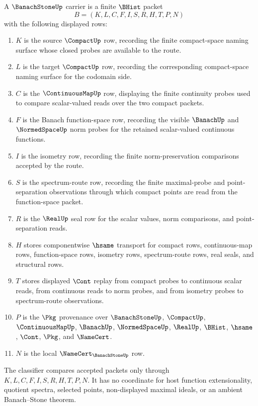 \begin{definition}
\label{def:banach-stone-carrier}
A $\BanachStoneUp$ carrier is a finite $\BHist$ packet
$$
B=(K,L,C,F,I,S,R,H,T,P,N)
$$
with the following displayed rows:
\begin{enumerate}
\item $K$ is the source $\CompactUp$ row, recording the finite compact-space naming surface whose closed probes are available to the route.
\item $L$ is the target $\CompactUp$ row, recording the corresponding compact-space naming surface for the codomain side.
\item $C$ is the $\ContinuousMapUp$ row, displaying the finite continuity probes used to compare scalar-valued reads over the two compact packets.
\item $F$ is the Banach function-space row, recording the visible $\BanachUp$ and $\NormedSpaceUp$ norm probes for the retained scalar-valued continuous functions.
\item $I$ is the isometry row, recording the finite norm-preservation comparisons accepted by the route.
\item $S$ is the spectrum-route row, recording the finite maximal-probe and point-separation observations through which compact points are read from the function-space packet.
\item $R$ is the $\RealUp$ seal row for the scalar values, norm comparisons, and point-separation reads.
\item $H$ stores componentwise $\hsame$ transport for compact rows, continuous-map rows, function-space rows, isometry rows, spectrum-route rows, real seals, and structural rows.
\item $T$ stores displayed $\Cont$ replay from compact probes to continuous scalar reads, from continuous reads to norm probes, and from isometry probes to spectrum-route observations.
\item $P$ is the $\Pkg$ provenance over $\BanachStoneUp$, $\CompactUp$, $\ContinuousMapUp$, $\BanachUp$, $\NormedSpaceUp$, $\RealUp$, $\BHist$, $\hsame$, $\Cont$, $\Pkg$, and $\NameCert$.
\item $N$ is the local $\NameCert_{\BanachStoneUp}$ row.
\end{enumerate}
The classifier compares accepted packets only through $K,L,C,F,I,S,R,H,T,P,N$. It has no coordinate for host function extensionality, quotient spectra, selected points, non-displayed maximal ideals, or an ambient Banach--Stone theorem.
\end{definition}

